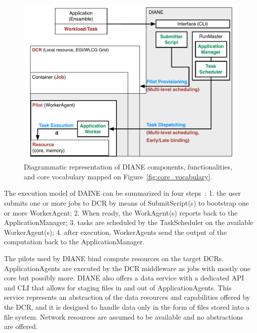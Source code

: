 \documentclass{sig-alternate}
\begin{document}
\begin{figure}[t]
    \centering
        \includegraphics[width=.48\textwidth]{figures/diane_comparison.pdf}
    \caption{Diagrammatic representation of DIANE components,
    functionalities, and core vocabulary mapped on
    Figure~\ref{fig:core_vocabulary}.}
    \label{fig:diane_comparison}
\end{figure}

The execution model of DAINE can be summarized in four
steps~\cite{moscicki2011understanding}: 1. the user submits one or more jobs to
DCR by means of SubmitScript(s) to bootstrap one or more WorkerAgent; 2. When
ready, the WorkAgent(s) reports back to the ApplicationManager; 3. tasks are
scheduled by the TaskScheduler on the available WorkerAgent(s); 4. after
execution, WorkerAgents send the output of the computation back to the
ApplicationManager.

 


The pilots used by DIANE bind compute resources on the target DCRs.
ApplicationAgents are executed by the DCR middleware as jobs with mostly one
core but possibly more. DIANE also offers a data service with a dedicated API
and CLI that allows for staging files in and out of ApplicationAgents. This
service represents an abstraction of the data resources and capabilities offered
by the DCR, and it is designed to handle data only in the form of files stored
into a file system. Network resources are assumed to be available and no
abstractions are offered.    
\end{document}
